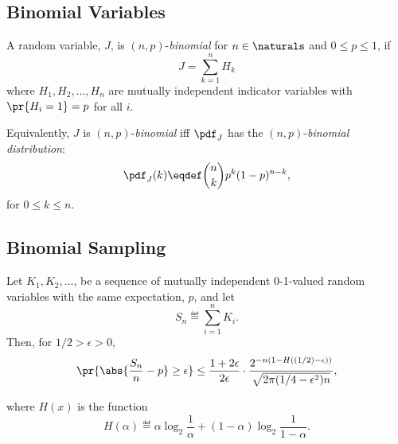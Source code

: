 \documentclass[handout]{mcs}
\begin{document}





\appendix

\subsection{Binomial Variables}
A random variable, $J$, is $(n,p)$-\emph{binomial} for
$n \in \naturals$ and $0 \leq p \leq 1$, if
\[
J = \sum_{k=1}^n H_k
\]
where $H_1,H_2,\dots,H_n$ are mutually independent indicator variables
with $\pr{H_i = 1} = p$ for all $i$.

Equivalently, $J$ is $(n,p)$-\emph{binomial} iff $\pdf_J$ has the
$(n,p)$-\emph{binomial distribution}:
\[
\pdf_J(k) \eqdef \binom{n}{k} p^k (1-p)^{n-k},
\]
for $0 \leq k \leq n$.


\subsection{Binomial Sampling}

\begin{theorem*}
Let $K_1, K_2, \dots$, be a sequence of mutually independent 0-1-valued
random variables with the same expectation, $p$, and let
\[
S_n \eqdef \sum_{i=1}^n K_i.
\]
Then, for $1/2 > \epsilon > 0$,
\begin{equation}\label{delta bound}
\pr{\abs{\frac{S_n}{n} - p} \geq \epsilon}
\leq 
\frac{1 + 2\epsilon}{2\epsilon} \cdot
        \frac{2^{-n (1 - H((1/2) - \epsilon))}}{\sqrt{2 \pi (1/4 - \epsilon^2) n}},
\end{equation}
\end{theorem*}
where $H(x)$ is the  function
\[
H(\alpha) \eqdef \alpha \log_2 \frac{1}{\alpha} +
                (1 - \alpha) \log_2 \frac{1}{1 - \alpha}.
\]
\end{document}
